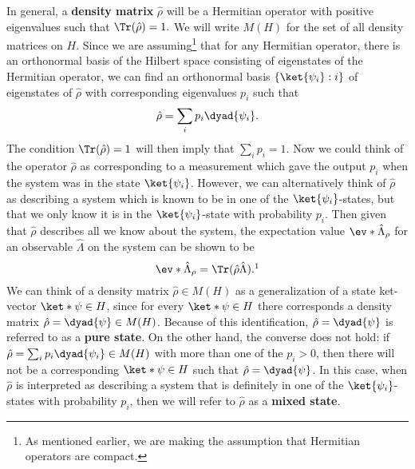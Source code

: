      In general, a \textbf{density matrix} $\hat{\rho}$ will  be a Hermitian operator with positive eigenvalues such that $\Tr(\hat{\rho})=1.$ We will write $M(H)$ for the set of all density matrices on $H$. Since we are assuming\footnote{As mentioned earlier, we are making the assumption that Hermitian operators are compact.} that for any Hermitian operator, there is an orthonormal basis of the Hilbert space consisting of eigenstates of the Hermitian operator, we can find an orthonormal basis $\{\ket{\psi_i}:i\}$ of eigenstates of $\hat{\rho}$ with corresponding eigenvalues $p_i$ such that 
    \begin{equation}\label{rhodiag}
    \hat{\rho}=\sum_i p_i\dyad{\psi_i}.
    \end{equation} 
    The condition $\Tr(\hat{\rho})=1$ will then imply that $\sum_i p_i =1$. Now we could think of the operator $\hat{\rho}$ as corresponding to a measurement which gave the output $p_i$ when the system was in the state $\ket{\psi_i}$. However, we can alternatively think of $\hat{\rho}$ as describing a system which is known to be in one of the $\ket{\psi_i}$-states, but that we only know it is in the $\ket{\psi_i}$-state with probability $p_i$. Then given that $\hat{\rho}$ describes all we know about the system, the expectation value $\ev*{\hat{\Lambda}}_\rho$ for an observable $\hat{\Lambda}$ on the system can be shown to be \begin{equation}\label{expdensity}\ev*{\hat{\Lambda}}_\rho=\Tr(\hat{\rho}\hat{\Lambda}).\protect\footnotemark\end{equation} We can think of a density matrix $\hat{\rho}\in M(H)$ as a generalization \label{genket} of a state ket-vector $\ket*{\psi}\in H$, since for every $\ket*{\psi}\in H$ there corresponds a density matrix $\hat{\rho}=\dyad{\psi}\in M(H)$. Because of this identification, $\hat{\rho}=\dyad{\psi}$ is referred to as a \textbf{pure state}. On the other hand, the converse does not hold: if $\hat{\rho}=\sum_i p_i\dyad{\psi_i}\in M(H)$ with more than one of the $p_i> 0$, then there will not be a corresponding $\ket*{\psi}\in H$ such that $\hat{\rho}=\dyad{\psi}$. In this case, when $\hat{\rho}$ is interpreted as describing a system that is definitely in one of the $\ket{\psi_i}$-states with probability $p_i$, then we will refer to $\hat{\rho}$ as a \textbf{mixed state}.\label{mixedstate}
